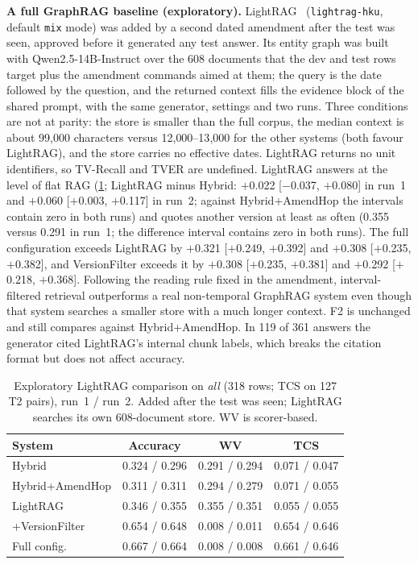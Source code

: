 \documentclass[sigconf,anonymous,review]{acmart}
\newcommand{\sys}[1]{\textsf{#1}}
\begin{document}
\textbf{A full GraphRAG baseline (exploratory).} LightRAG~\cite{guo2025lightrag} (\texttt{lightrag-hku}, default \texttt{mix} mode) was added by a second dated amendment after the test was seen, approved before it generated any test answer. Its entity graph was built with Qwen2.5-14B-Instruct over the 608 documents that the dev and test rows target plus the amendment commands aimed at them; the query is the date followed by the question, and the returned context fills the evidence block of the shared prompt, with the same generator, settings and two runs. Three conditions are not at parity: the store is smaller than the full corpus, the median context is about 99{,}000 characters versus 12{,}000--13{,}000 for the other systems (both favour LightRAG), and the store carries no effective dates. LightRAG returns no unit identifiers, so TV-Recall and TVER are undefined. LightRAG answers at the level of flat RAG (\cref{tab:lightrag}; LightRAG minus \sys{Hybrid}: $+$0.022 [$-$0.037, $+$0.080] in run~1 and $+$0.060 [$+$0.003, $+$0.117] in run~2; against \sys{Hybrid+AmendHop} the intervals contain zero in both runs) and quotes another version at least as often (0.355 versus 0.291 in run~1; the difference interval contains zero in both runs). The full configuration exceeds LightRAG by $+$0.321 [$+$0.249, $+$0.392] and $+$0.308 [$+$0.235, $+$0.382], and \sys{VersionFilter} exceeds it by $+$0.308 [$+$0.235, $+$0.381] and $+$0.292 [$+$0.218, $+$0.368]. Following the reading rule fixed in the amendment, interval-filtered retrieval outperforms a real non-temporal GraphRAG system even though that system searches a smaller store with a much longer context. F2 is unchanged and still compares against \sys{Hybrid+AmendHop}. In 119 of 361 answers the generator cited LightRAG's internal chunk labels, which breaks the citation format but does not affect accuracy.

\begin{table}[t]
\centering
\caption{Exploratory LightRAG comparison on \textit{all} (318 rows; TCS on 127 T2 pairs), run~1 / run~2. Added after the test was seen; LightRAG searches its own 608-document store. WV is scorer-based.}
\label{tab:lightrag}
\setlength{\tabcolsep}{3pt}
\footnotesize
\begin{tabular}{@{}l c c c@{}}
\toprule
System & Accuracy & WV & TCS \\
\midrule
Hybrid & 0.324 / 0.296 & 0.291 / 0.294 & 0.071 / 0.047 \\
Hybrid+AmendHop & 0.311 / 0.311 & 0.294 / 0.279 & 0.071 / 0.055 \\
LightRAG & 0.346 / 0.355 & 0.355 / 0.351 & 0.055 / 0.055 \\
+VersionFilter & 0.654 / 0.648 & 0.008 / 0.011 & 0.654 / 0.646 \\
Full config. & 0.667 / 0.664 & 0.008 / 0.008 & 0.661 / 0.646 \\
\bottomrule
\end{tabular}
\end{table}
\end{document}
